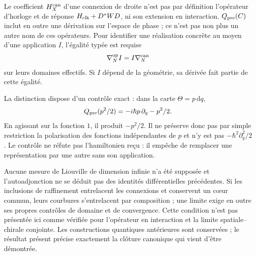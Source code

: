 Le coefficient \(H_X^{\rm can}\) d’une connexion de droite n’est pas par définition l’opérateur d’horloge et de réponse \(H_{\rm clk}+D^*WD\), ni son extension en interaction. \(Q_{\rm pre}(C)\) inclut en outre une dérivation sur l’espace de phase ; ce n’est pas non plus un autre nom de ces opérateurs. Pour identifier une réalisation concrète au moyen d’une application \(I\), l’égalité typée est requise
\[
 \nabla_N^{\rm op}I=I\nabla_N^{\rm can}
\]
sur leurs domaines effectifs. Si \(I\) dépend de la géométrie, sa dérivée fait partie de cette égalité.

La distinction dispose d’un contrôle exact : dans la carte \(\Theta=p\,\mathrm dq\),
\begin{equation}
 Q_{\rm pre}(p^2/2)=-i\hbar p\,\partial_q-p^2/2.
 \label{hmtcuatro:control-polarizacion}
\end{equation}
En agissant sur la fonction \(1\), il produit \(-p^2/2\). Il ne préserve donc pas par simple restriction la polarisation des fonctions indépendantes de \(p\) et n’y est pas \(-\hbar^2\partial_q^2/2\). Le contrôle ne réfute pas l’hamiltonien reçu : il empêche de remplacer une représentation par une autre sans son application.

Aucune mesure de Liouville de dimension infinie n’a été supposée et l’autoadjonction ne se déduit pas des identités différentielles précédentes. Si les inclusions de raffinement entrelacent les connexions et conservent un cœur commun, leurs courbures s’entrelacent par composition ; une limite exige en outre ses propres contrôles de domaine et de convergence. Cette condition n’est pas présentée ici comme vérifiée pour l’opérateur en interaction et la limite spatiale--chirale conjointe. Les constructions quantiques antérieures sont conservées ; le résultat présent précise exactement la clôture canonique qui vient d’être démontrée.
